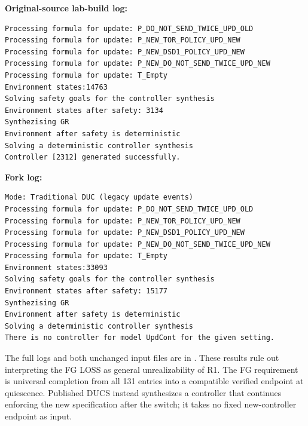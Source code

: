 \documentclass[11pt]{article}
\begin{document}
\noindent\textbf{Original-source lab-build log:}
{\footnotesize\begin{verbatim}
Processing formula for update: P_DO_NOT_SEND_TWICE_UPD_OLD
Processing formula for update: P_NEW_TOR_POLICY_UPD_NEW
Processing formula for update: P_NEW_DSD1_POLICY_UPD_NEW
Processing formula for update: P_NEW_DO_NOT_SEND_TWICE_UPD_NEW
Processing formula for update: T_Empty
Environment states:14763
Solving safety goals for the controller synthesis
Environment states after safety: 3134
Synthezising GR
Environment after safety is deterministic
Solving a deterministic controller synthesis
Controller [2312] generated successfully.
\end{verbatim}}
\noindent\begin{minipage}{\linewidth}
\textbf{Fork log:}
{\footnotesize\begin{verbatim}
Mode: Traditional DUC (legacy update events)
Processing formula for update: P_DO_NOT_SEND_TWICE_UPD_OLD
Processing formula for update: P_NEW_TOR_POLICY_UPD_NEW
Processing formula for update: P_NEW_DSD1_POLICY_UPD_NEW
Processing formula for update: P_NEW_DO_NOT_SEND_TWICE_UPD_NEW
Processing formula for update: T_Empty
Environment states:33093
Solving safety goals for the controller synthesis
Environment states after safety: 15177
Synthezising GR
Environment after safety is deterministic
Solving a deterministic controller synthesis
There is no controller for model UpdCont for the given setting.
\end{verbatim}}
\end{minipage}\par
The full logs and both unchanged input files are in
.
These results rule out interpreting the FG LOSS as general unrealizability of R1. The FG requirement is universal completion from all 131 entries into a compatible verified endpoint at quiescence. Published DUCS instead synthesizes a controller that continues enforcing the new specification after the switch; it takes no fixed new-controller endpoint as input.
\end{document}
